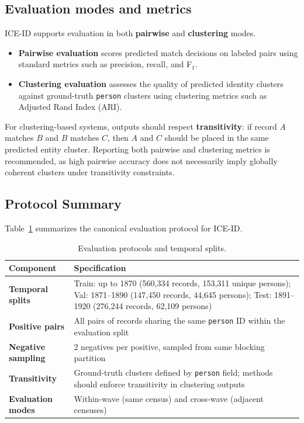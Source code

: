 \documentclass{article}
\begin{document}
\subsection{Evaluation modes and metrics}
ICE-ID supports evaluation in both \textbf{pairwise} and \textbf{clustering} modes.
\begin{itemize}
    \item \textbf{Pairwise evaluation} scores predicted match decisions on labeled pairs using standard metrics such as precision, recall, and F$_1$.
    \item \textbf{Clustering evaluation} assesses the quality of predicted identity clusters against ground-truth \texttt{person} clusters using clustering metrics such as Adjusted Rand Index (ARI).
\end{itemize}
For clustering-based systems, outputs should respect \textbf{transitivity}: if record $A$ matches $B$ and $B$ matches $C$, then $A$ and $C$ should be placed in the same predicted entity cluster. Reporting both pairwise and clustering metrics is recommended, as high pairwise accuracy does not necessarily imply globally coherent clusters under transitivity constraints.



\subsection{Protocol Summary}
\label{sec:protocols_splits}

Table~\ref{tab:protocols} summarizes the canonical evaluation protocol for ICE-ID.

\begin{table}[ht]
  \centering
  \caption{Evaluation protocols and temporal splits.}
  \label{tab:protocols}
  \small
  \begin{tabular}{lp{10cm}}
    \toprule
    \textbf{Component} & \textbf{Specification} \\
    \midrule
    \textbf{Temporal splits} & Train: up to 1870 (560,334 records, 153,311 unique persons); Val: 1871--1890 (147,450 records, 44,645 persons); Test: 1891--1920 (276,244 records, 62,109 persons) \\
    \textbf{Positive pairs} & All pairs of records sharing the same \texttt{person} ID within the evaluation split \\
    \textbf{Negative sampling} & 2 negatives per positive, sampled from same blocking partition \\
    \textbf{Transitivity} & Ground-truth clusters defined by \texttt{person} field; methods should enforce transitivity in clustering outputs \\
    \textbf{Evaluation modes} & Within-wave (same census) and cross-wave (adjacent censuses) \\
    \bottomrule
  \end{tabular}
\end{table}
\end{document}
